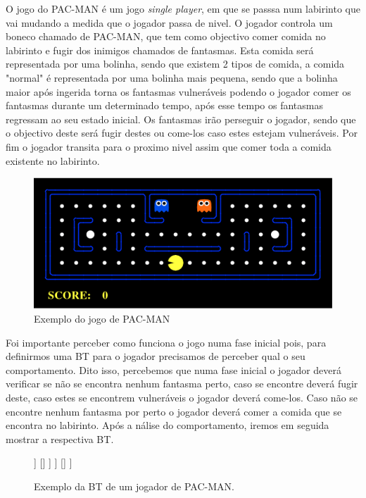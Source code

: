 O jogo do PAC-MAN é um jogo \textit{single player}, em que se passsa num labirinto que vai mudando a medida que o jogador passa de nivel. O jogador controla um boneco chamado de PAC-MAN, que tem como objectivo comer comida no labirinto e fugir dos inimigos chamados de fantasmas. Esta comida será representada por uma bolinha, sendo que existem 2 tipos de comida, a comida "normal" é representada por uma bolinha mais pequena, sendo que a bolinha maior após ingerida torna os fantasmas vulneráveis podendo o jogador comer os fantasmas durante um determinado tempo, após esse tempo os fantasmas regressam ao seu estado inicial. Os fantasmas irão perseguir o jogador, sendo que o objectivo deste será fugir destes ou come-los caso estes estejam vulneráveis. Por fim o jogador transita para o proximo nivel assim que comer toda a comida existente no labirinto.

\begin{figure}[h!]
\centering
\includegraphics[scale=0.5]{report/Figures/PACMAN.PNG}
\caption{Exemplo do jogo de PAC-MAN}
\label{fig:traducao}
\end{figure}

Foi importante perceber como funciona o jogo numa fase inicial pois, para definirmos uma BT para o jogador precisamos de perceber qual o seu comportamento. Dito isso, percebemos que numa fase inicial o jogador deverá verificar se não se encontra nenhum fantasma perto, caso se encontre deverá fugir deste, caso estes se encontrem vulneráveis o jogador deverá come-los. Caso não se encontre nenhum fantasma por perto o jogador deverá comer a comida que se encontra no labirinto. Após a nálise do comportamento, iremos em seguida mostrar a respectiva BT.


        \begin{figure}[H]
        \centering
        \begin{behavior}
            [\selector
                [\sequence
                    [\condition{Fantasmas Perto}]
                    [\selector
                        [\sequence
                            [\condition{Fantasmas Vulneráveis}]
                            [\action{Perseguir Fantasmas}]
                        ]
                        []
                    ]
                ]
                []
            ]
        \end{behavior}
        \caption{Exemplo da BT de um jogador de PAC-MAN.}
        \label{fig:2.9}
        \end{figure}